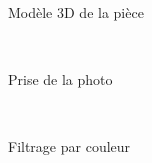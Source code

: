 \begin{figure}[H]
\begin{minipage}{0.4\textwidth}
\begin{subfigure}{0.8\linewidth}
            \caption{Modèle 3D de la pièce}
        \end{subfigure}\\[0.2cm]
        \begin{subfigure}{0.8\linewidth}
            \caption{Prise de la photo}
        \end{subfigure}\\[0.2cm]
        \begin{subfigure}{0.8\linewidth}
            \caption{Filtrage par couleur}
        \end{subfigure}\\[0.2cm]
        \begin{subfigure}{0.8\linewidth}

\end{subfigure}
\end{minipage}
\end{figure}
